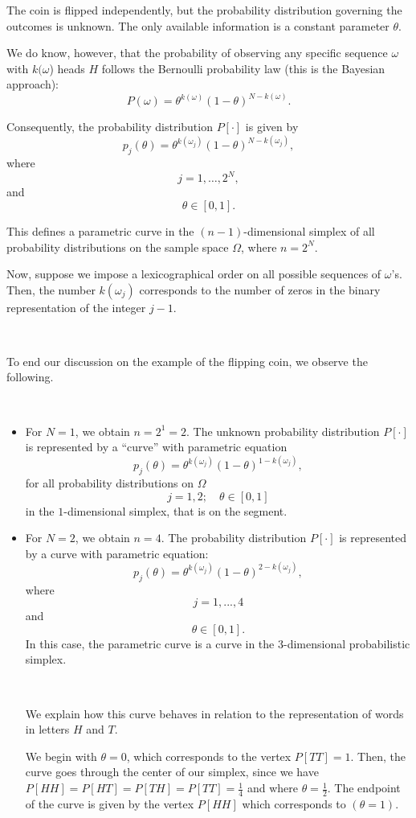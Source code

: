 \begin{example}
    The coin is flipped independently, but the probability distribution governing the outcomes is unknown. The only available information is a constant parameter $\theta $.  

    We do know, however, that the probability of observing any specific sequence  $\omega$  with $k(\omega$)  heads  $H$  follows the Bernoulli probability law (this is the Bayesian approach):
    \[
    P(\omega) = \theta^{k(\omega)} (1 - \theta)^{N-k(\omega)}.
    \]
    
    Consequently, the probability distribution $P[\cdot]$  is given by
    \[
    p_j(\theta) = \theta^{k({\omega}_j)} (1 - \theta)^{N- k ({\omega}_j)}, 
    \]
    where
    \[
    j=1, \dots, 2^{N},
    \]
    and
    \[
    \theta \in [0,1].
    \]
    
    This defines a parametric curve in the $(n - 1)$-dimensional simplex of all probability distributions on the sample space  $\Omega$, where $ n=2^N $.
    
    Now, suppose we impose a lexicographical order on all possible sequences of $ \omega$'s. Then, the number $ k({\omega}_j) $ corresponds to the number of zeros in the binary representation of the integer $ j - 1 $.
\end{example}

\,

To end our discussion on the example of the flipping coin, we observe the following. 

\begin{example}~
    \begin{itemize}
        \item For $N=1$, we obtain $n=2^1=2$.
         The unknown probability distribution  $P[\cdot]$ is represented by a  ``curve'' with parametric equation
    \[
    p_j(\theta) = \theta ^{k(\omega_j)}
    (1- \theta)^{1- k({\omega}_j)}, 
    \]
for all probability distributions on $\Omega$    
\[
    j=1,2;\quad \theta \in [0,1]
    \]
     in the $1$-dimensional simplex, that is on the segment.

      \item  For $N=2$, we obtain $n=4$.
         The probability distribution $P[\cdot]$ is represented by a curve with parametric equation:   
\[
p_j(\theta) = \theta^{k({\omega}_j)} (1- \theta)^{2-k({\omega}_j)},
\]
where
\[
 j= 1,...,4
\]
and
\[
 \theta \in [0,1].
\]
In this case, the parametric curve is a curve in the $3$-dimensional probabilistic simplex.

\, 

We explain how this curve behaves in relation to the representation of words in letters $H$ and $T$. 

We begin with $\theta=0$, which corresponds to the vertex $P[TT]=1$. Then, the curve goes through the center of our simplex, since we have $P[HH]=P[HT]=P[TH]=P[TT]=\frac{1}{4}$ and where $\theta =\frac{1}{2}$. The endpoint of the curve is given by the vertex $P[HH]$ which corresponds to $(\theta=1)$.
    \end{itemize}   
\end{example}

